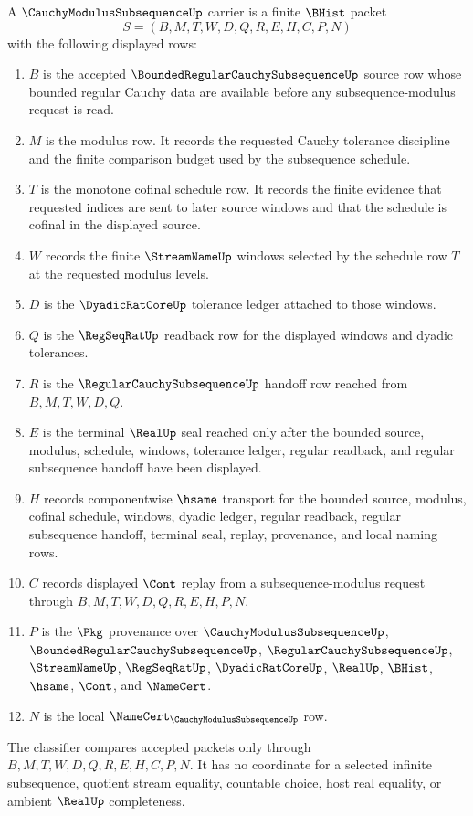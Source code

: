 \begin{definition}
\label{def:cauchy-modulus-subsequence-carrier}
A $\CauchyModulusSubsequenceUp$ carrier is a finite $\BHist$ packet
$$
S=(B,M,T,W,D,Q,R,E,H,C,P,N)
$$
with the following displayed rows:
\begin{enumerate}
\item $B$ is the accepted $\BoundedRegularCauchySubsequenceUp$ source row whose bounded regular Cauchy data are available before any subsequence-modulus request is read.
\item $M$ is the modulus row. It records the requested Cauchy tolerance discipline and the finite comparison budget used by the subsequence schedule.
\item $T$ is the monotone cofinal schedule row. It records the finite evidence that requested indices are sent to later source windows and that the schedule is cofinal in the displayed source.
\item $W$ records the finite $\StreamNameUp$ windows selected by the schedule row $T$ at the requested modulus levels.
\item $D$ is the $\DyadicRatCoreUp$ tolerance ledger attached to those windows.
\item $Q$ is the $\RegSeqRatUp$ readback row for the displayed windows and dyadic tolerances.
\item $R$ is the $\RegularCauchySubsequenceUp$ handoff row reached from $B,M,T,W,D,Q$.
\item $E$ is the terminal $\RealUp$ seal reached only after the bounded source, modulus, schedule, windows, tolerance ledger, regular readback, and regular subsequence handoff have been displayed.
\item $H$ records componentwise $\hsame$ transport for the bounded source, modulus, cofinal schedule, windows, dyadic ledger, regular readback, regular subsequence handoff, terminal seal, replay, provenance, and local naming rows.
\item $C$ records displayed $\Cont$ replay from a subsequence-modulus request through $B,M,T,W,D,Q,R,E,H,P,N$.
\item $P$ is the $\Pkg$ provenance over $\CauchyModulusSubsequenceUp$, $\BoundedRegularCauchySubsequenceUp$, $\RegularCauchySubsequenceUp$, $\StreamNameUp$, $\RegSeqRatUp$, $\DyadicRatCoreUp$, $\RealUp$, $\BHist$, $\hsame$, $\Cont$, and $\NameCert$.
\item $N$ is the local $\NameCert_{\CauchyModulusSubsequenceUp}$ row.
\end{enumerate}
The classifier compares accepted packets only through $B,M,T,W,D,Q,R,E,H,C,P,N$. It has no coordinate for a selected infinite subsequence, quotient stream equality, countable choice, host real equality, or ambient $\RealUp$ completeness.
\end{definition}

